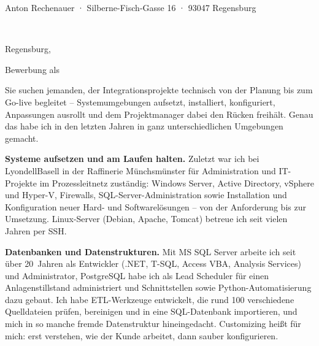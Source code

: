 \documentclass[11pt,a4paper]{article}
\newcommand*{\semibold}{\fontseries{sb}\selectfont}
\newcommand*{\heavy}{\fontseries{k}\selectfont}
\newcommand*{\optline}[1]{\ifdefempty{#1}{}{#1\\}}
\begin{document}
{\footnotesize\color{muted}Anton Rechenauer · Silberne-Fisch-Gasse 16 · 93047 Regensburg}\par
\vspace{2pt}
\begin{minipage}[t]{0.6\textwidth}
  \raggedright
  {\semibold\Firma}\\
  \optline{\Abteilung}%
  \optline{\Ansprechpartner}%
  \optline{\Strasse}%
  \Ort
\end{minipage}%
\hfill
\begin{minipage}[t]{0.35\textwidth}
  \raggedleft
  \vspace{0pt}\par
  Regensburg, \Datum
\end{minipage}

\vspace{1.0cm}

{\large\color{band}\heavy Bewerbung als \Stelle}\par
\vspace{-0.4em}
{\small\color{muted}%
  }\par

\vspace{0.6em}

\Anrede

Sie suchen jemanden, der Integrationsprojekte technisch von der Planung bis zum Go-live
begleitet -- Systemumgebungen aufsetzt, installiert, konfiguriert, Anpassungen ausrollt und
dem Projektmanager dabei den Rücken freihält. Genau das habe ich in den letzten Jahren in
ganz unterschiedlichen Umgebungen gemacht.%

\textbf{Systeme aufsetzen und am Laufen halten.} Zuletzt war ich bei LyondellBasell in der
Raffinerie Münchsmünster für Administration und IT-Projekte im Prozessleitnetz zuständig:
Windows Server, Active Directory, vSphere und Hyper-V, Firewalls, SQL-Server-Administration
sowie Installation und Konfiguration neuer Hard- und Softwarelösungen -- von der Anforderung
bis zur Umsetzung. Linux-Server (Debian, Apache, Tomcat) betreue ich seit vielen Jahren per SSH.

\textbf{Datenbanken und Datenstrukturen.} Mit MS SQL Server arbeite ich seit über 20~Jahren
als Entwickler (.NET, T-SQL, Access VBA, Analysis Services) und Administrator, PostgreSQL habe
ich als Lead Scheduler für einen Anlagenstillstand administriert und Schnittstellen sowie
Python-Automatisierung dazu gebaut. Ich habe ETL-Werkzeuge entwickelt, die rund 100
verschiedene Quelldateien prüfen, bereinigen und in eine SQL-Datenbank importieren, und mich
in so manche fremde Datenstruktur hineingedacht. Customizing heißt für mich: erst verstehen,
wie der Kunde arbeitet, dann sauber konfigurieren.
\end{document}
